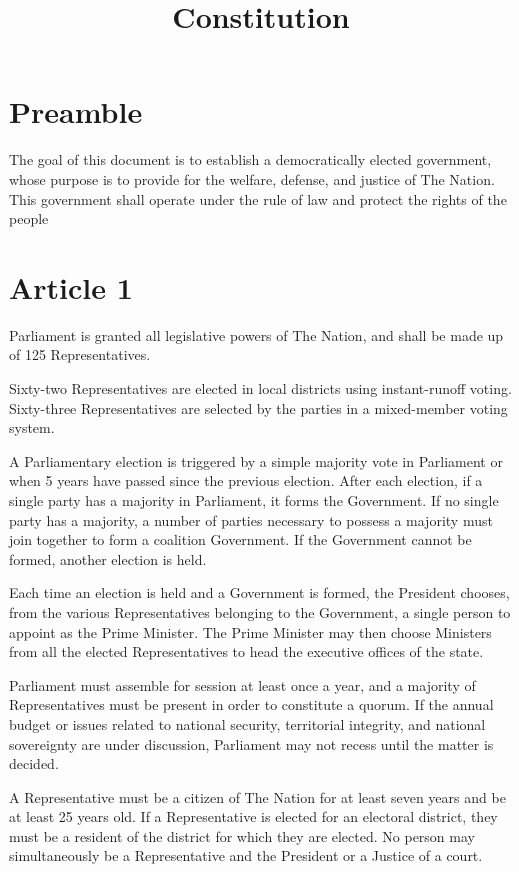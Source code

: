 \documentclass{report}
\title{Constitution}
\newcommand{\nation}{The Nation}
\begin{document}
    \maketitle
    \section{Preamble}
    The goal of this document is to establish a democratically elected government,
    whose purpose is to provide for the welfare, defense, and justice of \nation.
    This government shall operate under the rule of law and protect the rights of
    the people

    \section{Article 1}

    Parliament is granted all legislative powers of \nation, and shall be made
    up of 125 Representatives.

    Sixty-two Representatives are elected in local districts using instant-runoff
    voting. Sixty-three Representatives are selected by the parties in a
    mixed-member voting system.

    A Parliamentary election is triggered by a simple majority vote in Parliament
    or when 5 years have passed since the previous election. After each election,
    if a single party has a majority in Parliament, it forms the Government. If
    no single party has a majority, a number of parties necessary to possess a
    majority must join together to form a coalition Government. If the Government
    cannot be formed, another election is held.

    Each time an election is held and a Government is formed, the President
    chooses, from the various Representatives belonging to the Government, a
    single person to appoint as the Prime Minister. The Prime Minister may then
    choose Ministers from all the elected Representatives to head the executive
    offices of the state.

    Parliament must assemble for session at least once a year, and a majority of
    Representatives must be present in order to constitute a quorum. If the
    annual budget or issues related to national security, territorial integrity,
    and national sovereignty are under discussion, Parliament may not recess
    until the matter is decided.

    A Representative must be a citizen of \nation{} for at least seven years and
    be at least 25 years old. If a Representative is elected for an electoral
    district, they must be a resident of the district for which they are
    elected. No person may simultaneously be a Representative and the President
    or a Justice of a court.
\end{document}
